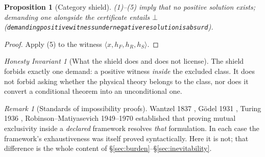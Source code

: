 \documentclass[11pt,a4paper]{article}
\theoremstyle{plain}
\newtheorem{proposition}[theorem]{Proposition}
\theoremstyle{definition}
\theoremstyle{remark}
\newtheorem{remark}[theorem]{Remark}
\newtheorem{invariant}[theorem]{Honesty Invariant}
\renewcommand{\_}{\oldunderscore\allowbreak}
\newcommand{\Lean}[1]{\texttt{\small #1}}
\begin{document}
\begin{proposition}[Category shield]\label{prop:shield}
(1)--(5) imply that no positive solution exists; demanding one alongside the certificate entails
$\bot$ (\Lean{demanding\_positive\_witness\_under\_negative\_resolution\_is\_absurd}).
\end{proposition}
\begin{proof}
Apply (5) to the witness $\langle x,h_F,h_R,h_S\rangle$.
\end{proof}
\begin{invariant}[What the shield does and does not license]\label{inv:shield-scope}
The shield forbids exactly one demand: a positive witness \emph{inside} the excluded class. It
does not forbid asking whether the physical theory belongs to the class, nor does it convert a
conditional theorem into an unconditional one.
\end{invariant}
\begin{remark}[Standards of impossibility proofs]
Wantzel 1837 \cite{Wantzel1837}, G\"odel 1931 \cite{Godel1931}, Turing 1936 \cite{Turing1936},
Robinson--Matiyasevich 1949--1970 \cite{Robinson1949,Matiyasevich1970} established that proving
mutual exclusivity inside a \emph{declared} framework resolves \emph{that} formulation. In each
case the framework's exhaustiveness was itself proved syntactically. Here it is not; that
difference is the whole content of \S\ref{sec:burden}--\S\ref{sec:inevitability}.
\end{remark}
\end{document}
